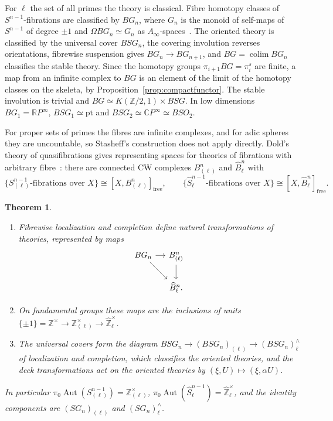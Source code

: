 \documentclass[11pt]{amsart}
\theoremstyle{plain}
\newtheorem{theorem}{Theorem}[section]
\theoremstyle{definition}
\numberwithin{equation}{section}
\newcommand{\Z}{\mathbb{Z}}
\newcommand{\Zhat}{\widehat{\mathbb{Z}}}
\newcommand{\Zl}{\mathbb{Z}_{(\ell)}}
\newcommand{\CP}{\mathbb{C}P}
\newcommand{\RP}{\mathbb{R}P}
\newcommand{\units}{^{\times}}
\DeclareMathOperator{\Aut}{Aut}
\DeclareMathOperator{\colim}{colim}
\begin{document}
For $\ell$ the set of all primes the theory is classical.
Fibre homotopy classes of $S^{n-1}$-fibrations are classified by $BG_n$, where $G_n$ is the monoid of self-maps of $S^{n-1}$ of degree $\pm1$ and $\Omega BG_n\simeq G_n$ as $A_\infty$-spaces~\cite{Stasheff}.
The oriented theory is classified by the universal cover $BSG_n$, the covering involution reverses orientations, fibrewise suspension gives $BG_n\to BG_{n+1}$, and $BG=\colim BG_n$ classifies the stable theory.
Since the homotopy groups $\pi_{i+1}BG=\pi_i^s$ are finite, a map from an infinite complex to $BG$ is an element of the limit of the homotopy classes on the skeleta, by Proposition~\ref{prop:compactfunctor}.
The stable involution is trivial and $BG\simeq K(\Z/2,1)\times BSG$.
In low dimensions $BG_1=\RP^\infty$, $BSG_1\simeq\mathrm{pt}$ and $BSG_2\simeq\CP^\infty\simeq BSO_2$.

For proper sets of primes the fibres are infinite complexes, and for adic spheres they are uncountable, so Stasheff's construction does not apply directly.
Dold's theory of quasifibrations gives representing spaces for theories of fibrations with arbitrary fibre~\cite{Dold}: there are connected CW complexes $B^n_{(\ell)}$ and $\widehat B^n_\ell$ with
\[
\{S^{n-1}_{(\ell)}\text{-fibrations over }X\}\cong[X,B^n_{(\ell)}]_{\mathrm{free}},\qquad \{\widehat S^{n-1}_\ell\text{-fibrations over }X\}\cong[X,\widehat B^n_\ell]_{\mathrm{free}}.
\]

\begin{theorem}\label{thm:sphericalmain}
\begin{enumerate}[label=\textup{(\arabic*)}]
\item Fibrewise localization and completion define natural transformations of theories, represented by maps
\[
\begin{tikzcd}[column sep=small]
BG_n\arrow[r]\arrow[rd] & B^n_{(\ell)}\arrow[d]\\
& \widehat B^n_\ell .
\end{tikzcd}
\]
\item On fundamental groups these maps are the inclusions of units $\{\pm1\}=\Z\units\to\Zl\units\to\Zhat_\ell\units$.
\item The universal covers form the diagram $BSG_n\to(BSG_n)_{(\ell)}\to(BSG_n)^\wedge_\ell$ of localization and completion, which classifies the oriented theories, and the deck transformations act on the oriented theories by $(\xi,U)\mapsto(\xi,\alpha U)$.
\end{enumerate}
In particular $\pi_0\Aut(S^{n-1}_{(\ell)})=\Zl\units$, $\pi_0\Aut(\widehat S^{n-1}_\ell)=\Zhat_\ell\units$, and the identity components are $(SG_n)_{(\ell)}$ and $(SG_n)^\wedge_\ell$.
\end{theorem}
\end{document}
